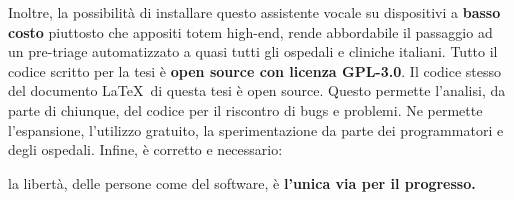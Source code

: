 Inoltre, la possibilità di installare questo assistente vocale su dispositivi a \textbf{basso costo} piuttosto che appositi totem high-end, rende abbordabile il passaggio ad un pre-triage automatizzato a quasi tutti gli ospedali e cliniche italiani.
Tutto il codice scritto per la tesi è \textbf{open source con licenza GPL-3.0}. Il codice stesso del documento \LaTeX\ di questa tesi è open source.
Questo permette l'analisi, da parte di chiunque, del codice per il riscontro di bugs e problemi. Ne permette l'espansione, l'utilizzo gratuito, la sperimentazione da parte dei programmatori e degli ospedali. Infine, è corretto e necessario:
\begin{center}
    la libertà, delle persone come del software, è \textbf{l'unica via per il progresso.}
\end{center}
